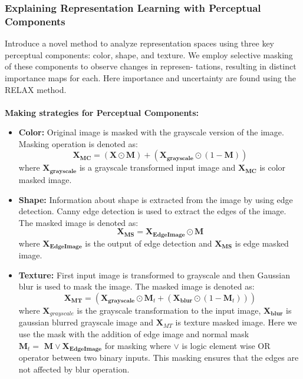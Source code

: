 \subsubsection{Explaining Representation Learning with Perceptual Components \cite{yarici2024explaining}}
Introduce a novel method to analyze representation spaces using three key perceptual components: color, shape, and texture. We employ selective
masking of these components to observe changes in represen-
tations, resulting in distinct importance maps for each. Here importance and uncertainty are found using the RELAX method. \\
\\
\textbf{Making strategies for Perceptual Components:}
\vspace{3mm}
\begin{itemize}
    \item \textbf{Color:} Original image is masked with the grayscale version of the image. Masking operation is denoted as:
    \begin{equation*}
        \mathbf{X_{MC}}= (\mathbf{X} \odot \textbf{M}) + (\mathbf{X_{grayscale}} \odot (1-\textbf{M}))
    \end{equation*}
    where $\mathbf{X_{grayscale}}$ is a grayscale transformed input image and $\mathbf{X_{MC}}$ is color masked image.
    \vspace{3mm}
    \item \textbf{Shape:} Information about shape is extracted from the image by using edge detection. Canny edge detection is used to extract the edges of the image. The masked image is denoted as:
    \begin{equation*}
        \mathbf{X_{MS}}= \mathbf{X_{EdgeImage}} \odot \mathbf{M}  
    \end{equation*}
    where $\mathbf{X_{EdgeImage}}$ is the output of edge detection and $\mathbf{X_{MS}}$ is edge masked image.
    \vspace{3mm}
    \item \textbf{Texture:} First input image is transformed to grayscale and then Gaussian blur is used to mask the image. The masked image is denoted as:
    \begin{equation*}
        \mathbf{X_{MT}}=  (\mathbf{X_{grayscale}} \odot \textbf{M}_{t} + (\mathbf{X_{blur}} \odot (1-\textbf{M}_t))) 
    \end{equation*}
    where $\textbf{X}_{grayscale}$ is the grayscale transformation to the input image, $\mathbf{X_{blur}}$ is gaussian blurred grayscale image  and $\textbf{X}_{MT}$ is texture masked image. Here we use the mask with the addition of edge image and normal mask $\textbf{M}_t=\textbf{ M}  \lor \mathbf{X_{EdgeImage}}$ for masking where $\lor$ is logic element wise OR operator between two binary inputs. This masking ensures that the edges are not affected by blur operation. 
\end{itemize}